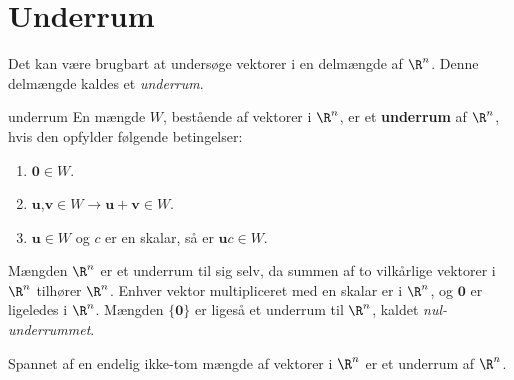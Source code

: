 \section{Underrum}
Det kan være brugbart at undersøge vektorer i en delmængde af $\R^n$.
Denne delmængde kaldes et \textit{underrum}.
%
\begin{defn}{}{underrum}
En mængde $W$, bestående af vektorer i $\R^n$, er et \textbf{underrum} af $\R^n$, hvis den opfylder følgende betingelser:	
\begin{enumerate}[label=(\alph*)]
\item $\textbf{0}\in W$.
\item $\textbf{u}$,$\textbf{v} \in W \rightarrow \textbf{u}+\textbf{v} \in W $.
\item $\textbf{u} \in W$ og $c$ er en skalar, så er $\textbf{u}c \in W$.
\end{enumerate}
\end{defn}
\noindent
Mængden $\R^n$ er et underrum til sig selv, da summen af to vilkårlige vektorer i $\R^n$ tilhører $\R^n$.
Enhver vektor multipliceret med en skalar er i $\R^n$, og $\textbf{0}$ er ligeledes i $\R^n$. 
Mængden $\{\textbf{0}\}$ er ligeså et underrum til $\R^n$, kaldet \textit{nul-underrummet}.
%
%
\begin{thm}{}{}
Spannet af en endelig ikke-tom mængde af vektorer i $\R^n$ er et underrum af $\R^n$.
\end{thm}
%
